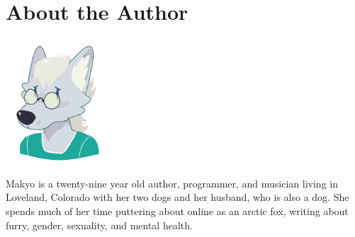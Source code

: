 \chapter*{About the Author}

\begin{center}
  \includegraphics[width=0.3\textwidth]{roryfrancis--fret--makyo}
\end{center}

Makyo is a twenty-nine year old author, programmer, and musician living in Loveland, Colorado with her two dogs and her husband, who is also a dog.  She spends much of her time puttering about online as an arctic fox, writing about furry, gender, sexuality, and mental health.
